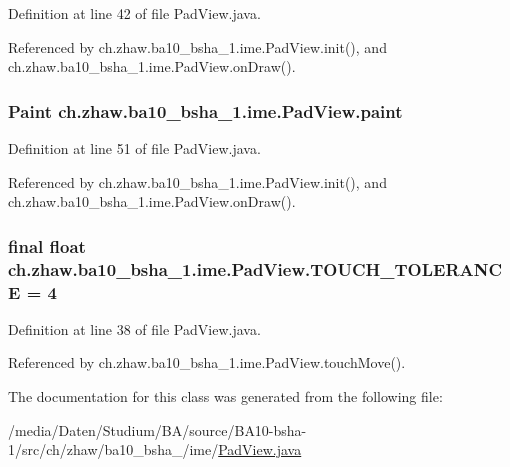 Definition at line 42 of file PadView.java.

Referenced by ch.zhaw.ba10\_\-bsha\_\-1.ime.PadView.init(), and ch.zhaw.ba10\_\-bsha\_\-1.ime.PadView.onDraw().\hypertarget{classch_1_1zhaw_1_1ba10__bsha__1_1_1ime_1_1PadView_a1122cb9b4a18be3bb5f96d56dea23ad6}{
\subsubsection[{paint}]{\setlength{\rightskip}{0pt plus 5cm}Paint {\bf ch.zhaw.ba10\_\-bsha\_\-1.ime.PadView.paint}}}
\label{classch_1_1zhaw_1_1ba10__bsha__1_1_1ime_1_1PadView_a1122cb9b4a18be3bb5f96d56dea23ad6}


Definition at line 51 of file PadView.java.

Referenced by ch.zhaw.ba10\_\-bsha\_\-1.ime.PadView.init(), and ch.zhaw.ba10\_\-bsha\_\-1.ime.PadView.onDraw().\hypertarget{classch_1_1zhaw_1_1ba10__bsha__1_1_1ime_1_1PadView_a5fa1919707284dc6019fbc707998b7fe}{
\subsubsection[{TOUCH\_\-TOLERANCE}]{\setlength{\rightskip}{0pt plus 5cm}final float {\bf ch.zhaw.ba10\_\-bsha\_\-1.ime.PadView.TOUCH\_\-TOLERANCE} = 4}}
\label{classch_1_1zhaw_1_1ba10__bsha__1_1_1ime_1_1PadView_a5fa1919707284dc6019fbc707998b7fe}


Definition at line 38 of file PadView.java.

Referenced by ch.zhaw.ba10\_\-bsha\_\-1.ime.PadView.touchMove().

The documentation for this class was generated from the following file:\begin{DoxyCompactItemize}
\item 
/media/Daten/Studium/BA/source/BA10-\/bsha-\/1/src/ch/zhaw/ba10\_\-bsha\_/ime/\hyperlink{PadView_8java}{PadView.java}\end{DoxyCompactItemize}

